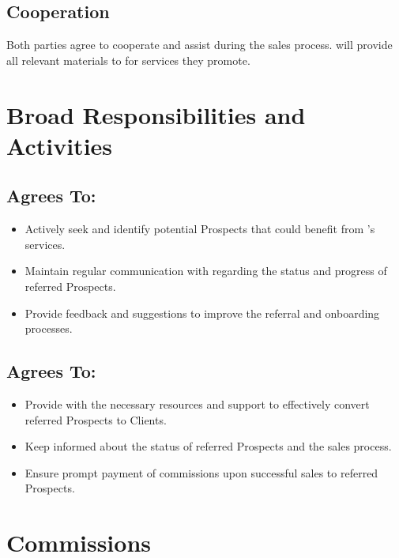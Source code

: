 \documentclass[12pt]{article}
\begin{document}
\subsection{Cooperation}
Both parties agree to cooperate and assist during the sales process.  
\partyBshort{} will provide all relevant materials to \partyAshort{} for services they promote.

\section{Broad Responsibilities and Activities}
\label{sec:responsibilities}

\subsection*{\partyAshort{} Agrees To:}
\begin{itemize}
  \item Actively seek and identify potential Prospects that could benefit from \partyBshort{}’s services.
  \item Maintain regular communication with \partyBshort{} regarding the status and progress of referred Prospects.
  \item Provide feedback and suggestions to improve the referral and onboarding processes.
 \end{itemize}

\subsection*{\partyBshort{} Agrees To:}
\begin{itemize}
  \item Provide \partyAshort{} with the necessary resources and support to effectively convert referred Prospects to Clients.
  \item Keep \partyAshort{} informed about the status of referred Prospects and the sales process.
  \item Ensure prompt payment of commissions upon successful sales to referred Prospects.
\end{itemize}

\section{Commissions}
\label{sec:commissions}
\end{document}
